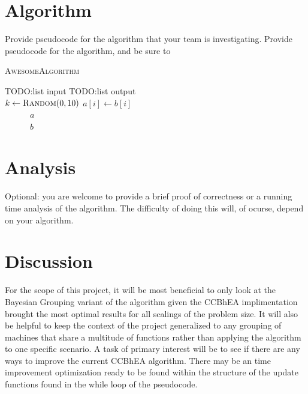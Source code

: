 \documentclass[11pt]{article}
\begin{document}
\section{Algorithm}
Provide pseudocode for the algorithm that your team is investigating.  Provide 
pseudocode for the algorithm, and be sure to 

\begin{algorithm}\caption{\textsc{AwesomeAlgorithm}}
 \begin{algorithmic}[1]
    TODO:list input
    TODO:list output\\
   
   \State $k \gets \textsc{Random}(0,10)$
	\State $a[i] \gets b[i]$
        \EndWhile\\
~~~~~~\Return $a$
   \Else\\
   ~~~~~~\Return $b$
   \EndIf
 \end{algorithmic}
\end{algorithm}

\section{Analysis}
Optional: you are welcome to provide a brief proof of correctness or a 
running time analysis of the algorithm.  The difficulty of doing this will, of 
ocurse, depend on your algorithm.

\section{Discussion}
For the scope of this project, it will be most beneficial to only look at the Bayesian Grouping variant of the algorithm given the CCBhEA implimentation brought the most optimal results for all scalings of the problem size. It will also be helpful to keep the context of the project generalized to any grouping of machines that share a multitude of functions rather than applying the algorithm to one specific scenario. A task of primary interest will be to see if there are any ways to improve the current CCBhEA algorithm. There may be an time improvement optimization ready to be found within the structure of the update functions found in the while loop of the pseudocode.
\end{document}
